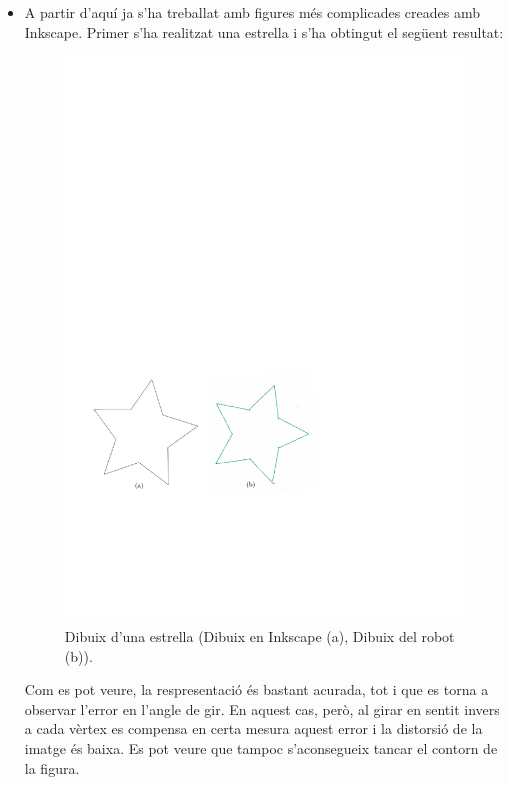 \begin{itemize}
	\item A partir d'aquí ja s'ha treballat amb figures més complicades creades amb Inkscape. Primer s'ha realitzat una estrella i s'ha obtingut el següent resultat:
	\begin{figure}[H]
		\centering
		\includegraphics[scale=0.9]{resultatEstrella}
		\caption{Dibuix d'una estrella (Dibuix en Inkscape (a), Dibuix del robot (b)).}
		\label{fig:estrella}
	\end{figure}
	Com es pot veure, la respresentació és bastant acurada, tot i que es torna a observar l'error en l'angle de gir. En aquest cas, però, al girar en sentit invers a cada vèrtex es compensa en certa mesura aquest error i la distorsió de la imatge és baixa. Es pot veure que tampoc s'aconsegueix tancar el contorn de la figura. 
	

\end{itemize}
